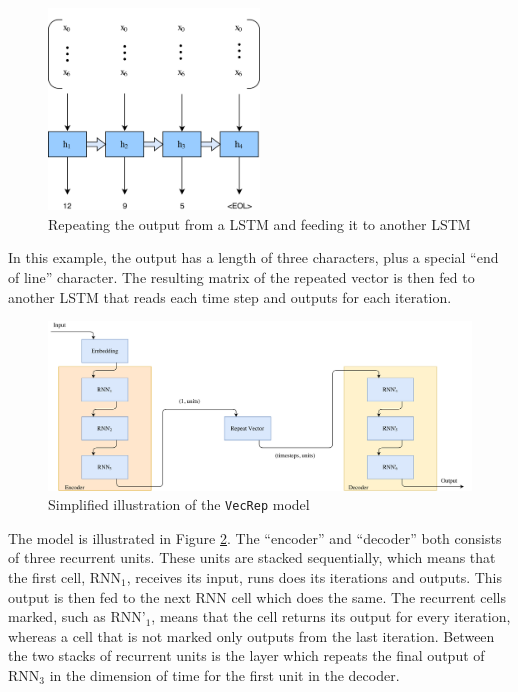 \begin{figure}[ht]
    \centering
    \includegraphics[width=0.5\textwidth]{fig/development_process/lstm-vector-projection-decoder.png}
    \caption{Repeating the output from a LSTM and feeding it to another LSTM}
    \label{fig:lstm-vector-projection-decoder}
\end{figure}

In this example, the output has a length of three characters, plus a special ``end of line'' character. The resulting matrix of the repeated vector is then fed to another LSTM that reads each time step and outputs for each iteration.

\begin{figure}[!ht]
    \centering
    \includegraphics[width=1\textwidth]{fig/models/vecrep_model.png}
    \caption{Simplified illustration of the {\tt VecRep} model}
    \label{fig:vecrep_model}
\end{figure}

The model is illustrated in Figure \ref{fig:vecrep_model}. The ``encoder'' and ``decoder'' both consists of three recurrent units. These units are stacked sequentially, which means that the first cell, \(\text{RNN}_1\), receives its input, runs does its iterations and outputs. This output is then fed to the next RNN cell which does the same. The recurrent cells marked, such as \(\text{RNN'}_1\), means that the cell returns its output for every iteration, whereas a cell that is not marked only outputs from the last iteration. Between the two stacks of recurrent units is the layer which repeats the final output of \(\text{RNN}_3\) in the dimension of time for the first unit in the decoder.


